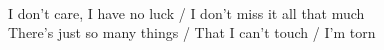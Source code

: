 \\
I don't care, I have no luck / I don't miss it all that much \\
There's just so many things / That I can't touch / I'm torn \\
\\

